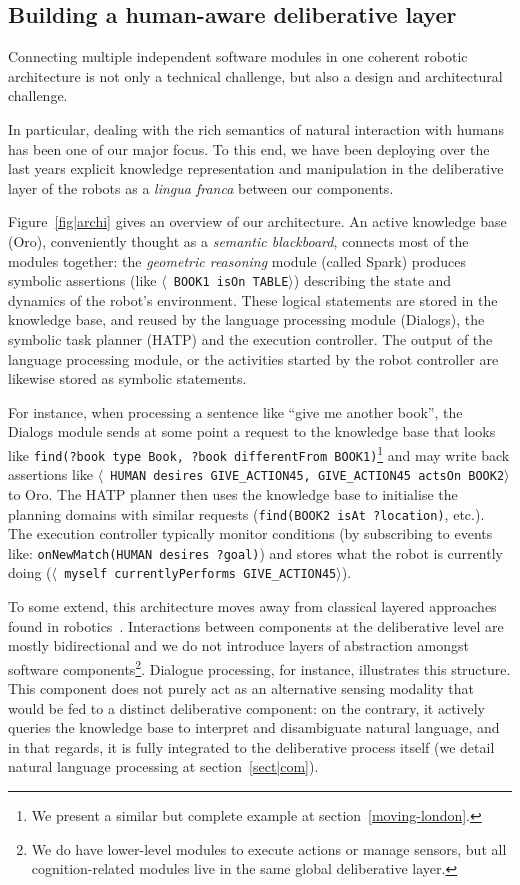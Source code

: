 \documentclass[preprint,3p,times]{elsarticle}
\newcommand{\stmt}[1]{{\footnotesize \tt $\langle$ #1\relax$\rangle$}}
\begin{document}
\subsection{Building a human-aware deliberative layer}

Connecting multiple independent software modules in one coherent robotic
architecture is not only a technical challenge, but also a design and
architectural challenge.

In particular, dealing with the rich semantics of natural interaction with
humans has been one of our major focus. To this end, we have been deploying
over the last years explicit knowledge representation and manipulation in the
deliberative layer of the robots as a {\it lingua franca} between our
components.

Figure~\ref{fig|archi} gives an overview of our architecture. An active
knowledge base ({\sc Oro}), conveniently thought as a \emph{semantic
blackboard}, connects most of the modules together: the \emph{geometric
reasoning} module (called {\sc Spark}) produces symbolic assertions (like
\stmt{BOOK1 isOn TABLE}) describing the state and dynamics of the robot's
environment. These logical statements are stored in the knowledge base, and
reused by the language processing module ({\sc Dialogs}), the symbolic task
planner (HATP) and the execution controller. The output of the language
processing module, or the activities started by the robot controller are
likewise stored as symbolic statements.

For instance, when processing a sentence like ``give me another book'', the {\sc
Dialogs} module sends at some point a request to the knowledge base that looks
like {\tt \footnotesize find(?book type Book, ?book differentFrom
BOOK1)}\footnote{We present a similar but complete example at
section~\ref{moving-london}.} and may write back assertions like \stmt{HUMAN
desires GIVE\_ACTION45, GIVE\_ACTION45 actsOn BOOK2} to {\sc Oro}. The HATP
planner then uses the knowledge base to initialise the planning domains with
similar requests ({\tt \footnotesize find(BOOK2 isAt ?location)}, etc.). The
execution controller typically monitor conditions (by subscribing to events
like: {\tt \footnotesize onNewMatch(HUMAN desires ?goal)}) and stores what the
robot is currently doing (\stmt{myself currentlyPerforms GIVE\_ACTION45}).

To some extend, this architecture moves away from classical layered approaches
found in robotics~\cite{Gat1998three, Volpe2001CLARAty, Goldberg2002}.
Interactions between components at the deliberative level are mostly
bidirectional and we do not introduce layers of abstraction amongst software
components\footnote{We do have lower-level modules to execute actions or manage
sensors, but all cognition-related modules live in the same global deliberative
layer.}. Dialogue processing, for instance, illustrates this structure. This
component does not purely act as an alternative sensing modality that would be
fed to a distinct deliberative component: on the contrary, it actively queries
the knowledge base to interpret and disambiguate natural language, and in that
regards, it is fully integrated to the deliberative process itself (we detail
natural language processing at section~\ref{sect|com}).
\end{document}
